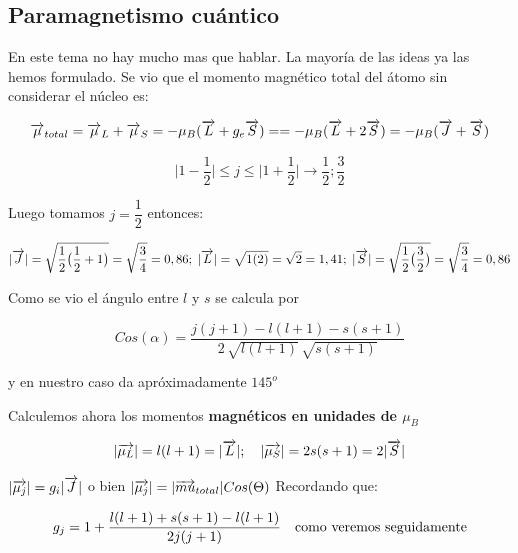 \subsection{Paramagnetismo cuántico}

En este tema no hay mucho mas que hablar. La mayoría de las ideas ya las hemos formulado. Se vio que el momento magnético total del átomo sin considerar el núcleo es:

\begin{equation}
\overrightarrow{\mu}_{total}= \overrightarrow{\mu}_{L}+\overrightarrow{\mu}_{S}=-\mu_{B}(\overrightarrow{L}+g_{e}\overrightarrow{S})= =-\mu_{B}(\overrightarrow{L}+2\overrightarrow{S})=-\mu_{B}(\overrightarrow{J}+\overrightarrow{S}) 
\end{equation}


\begin{equation*}
  \vert 1 - \dfrac{1}{2} \vert \leq j \leq  \vert 1 + \dfrac{1}{2} \vert \rightarrow \dfrac{1}{2}; \dfrac{3}{2}
\end{equation*}

Luego tomamos $j=\dfrac{1}{2}$ entonces:

\begin{equation*}
  |\overrightarrow{J}|=\sqrt{\dfrac{1}{2}\big(\dfrac{1}{2}+1\big)}=\sqrt{\dfrac{3}{4}}=0,86; \; |\overrightarrow{L}|=\sqrt{1(2)}=\sqrt{2}=1,41;\; |\overrightarrow{S}|=\sqrt{\dfrac{1}{2}\big( \dfrac{3}{2} \big)}= \sqrt{\dfrac{3}{4}}=0,86
\end{equation*}

Como se vio el ángulo entre $l$ y $s$ se calcula por

\begin{equation*}
	Cos(\alpha) = \dfrac{j(j+1)-l(l+1)-s(s+1)}{2\,\sqrt{l(l+1)}\,\sqrt{s(s+1)}}
\end{equation*}

y en nuestro caso da apróximadamente $145^{o}$

Calculemos ahora los momentos \textbf{magnéticos en unidades de $\mu_{B}$}

\begin{equation*}
  \vert \overrightarrow{\mu_{L}} \vert= l(l + 1)= \vert \overrightarrow{L} \vert;\quad \vert \overrightarrow{\mu_{S}} \vert=2s(s + 1)=2\vert \overrightarrow{S} \vert
\end{equation*}

$\vert \overrightarrow{\mu_{j}} \vert=g_{i}\vert \overrightarrow{J} \vert$ o bien $\vert \overrightarrow{\mu_{j}} \vert=|\overrightarrow{mu}_{total}|Cos(\Theta)$ Recordando que:

\begin{equation*}
	g_{j}= 1 +\dfrac{l(l + 1)+s(s + 1)-l(l + 1)}{2j(j + 1)} \quad \text{como veremos seguidamente}
\end{equation*} 

